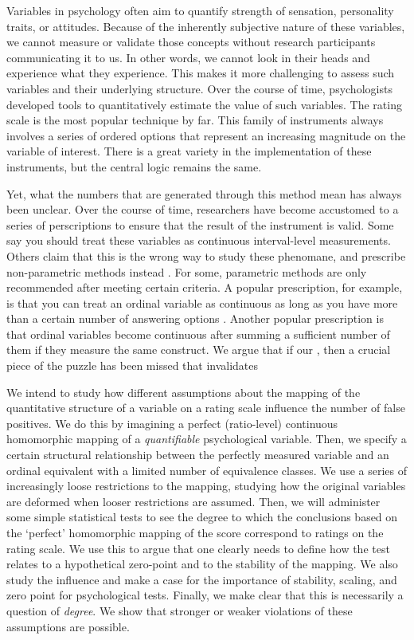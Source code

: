 \documentclass[utf8]{FrontiersinVancouver}
\begin{document}
Variables in psychology often aim to quantify strength of sensation, personality traits, or attitudes. Because of the inherently subjective nature of these variables, we cannot measure or validate those concepts without research participants communicating it to us. In other words, we cannot look in their heads and experience what they experience. This makes it more challenging to assess such variables and their underlying structure. Over the course of time, psychologists developed tools to quantitatively estimate the value of such variables. The rating scale is the most popular technique by far. This family of instruments always involves a series of ordered options that represent an increasing magnitude on the variable of interest. There is a great variety in the implementation of these instruments, but the central logic remains the same. 

Yet, what the numbers that are generated through this method mean has always been unclear. Over the course of time, researchers have become accustomed to a series of perscriptions to ensure that the result of the instrument is valid. Some say you should treat these variables as continuous interval-level measurements. Others claim that this is the wrong way to study these phenomane, and prescribe non-parametric methods instead \citep{knappTreatingOrdinalScales1990}. For some, parametric methods are only recommended after meeting certain criteria. A popular prescription, for example, is that you can treat an ordinal variable as continuous as long as you have more than a certain number of answering options \citep{wuCanLikertScales2017}. Another popular prescription is that ordinal variables become continuous after summing a sufficient number of them if they measure the same construct. We argue that if our , then a crucial piece of the puzzle has been missed that invalidates

We intend to study how different assumptions about the mapping of the quantitative structure of a variable on a rating scale influence the number of false positives. We do this by imagining a perfect (ratio-level) continuous homomorphic mapping of a \textit{quantifiable} psychological variable. Then, we specify a certain structural relationship between the perfectly measured variable and an ordinal equivalent with a limited number of equivalence classes. We use a series of increasingly loose restrictions to the mapping, studying how the original variables are deformed when looser restrictions are assumed. Then, we will administer some simple statistical tests to see the degree to which the conclusions based on the `perfect' homomorphic mapping of the score correspond to ratings on the rating scale. We use this to argue that one clearly needs to define how the test relates to a hypothetical zero-point and to the stability of the mapping. We also study the influence and make a case for the importance of stability, scaling, and zero point for psychological tests. Finally, we make clear that this is necessarily a question of \textit{degree}. We show that stronger or weaker violations of these assumptions are possible.
\end{document}
